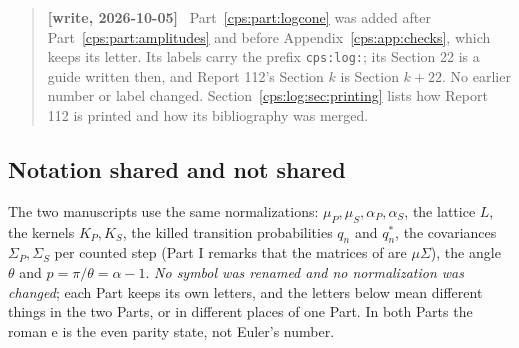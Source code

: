 \documentclass[11pt,letterpaper]{article}
\numberwithin{equation}{section}
\theoremstyle{remark}\newtheorem{remark}[theorem]{Remark}
\newenvironment{writenotelog}{\begin{quote}\small\sloppy\textbf{[write, 2026-10-05]}\ }{\end{quote}}
\begin{document}
\begin{writenotelog}
Part~\ref{cps:part:logcone} was added after Part~\ref{cps:part:amplitudes} and before
Appendix~\ref{cps:app:checks}, which keeps its letter. Its labels carry the prefix
\texttt{cps:log:}; its Section 22 is a guide written then, and Report 112's Section $k$ is
Section $k+22$. No earlier number or label changed. Section~\ref{cps:log:sec:printing} lists how
Report 112 is printed and how its bibliography was merged.
\end{writenotelog}

\subsection*{Notation shared and not shared}
The two manuscripts use the same normalizations: $\mu_P,\mu_S,\alpha_P,\alpha_S$, the lattice $L$,
the kernels $K_P,K_S$, the killed transition probabilities $q_n$ and $q_n^*$, the covariances
$\Sigma_P,\Sigma_S$ per counted step (Part I remarks that the matrices of \cite[Section 4.2]{FNS}
are $\mu\Sigma$), the angle $\theta$ and $p=\pi/\theta=\alpha-1$. \emph{No symbol was renamed and no
normalization was changed}; each Part keeps its own letters, and the letters below mean different
things in the two Parts, or in different places of one Part. In both Parts the roman
$\mathrm e$ is the even parity state, not Euler's number.
\end{document}
